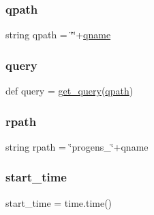 \mbox{\label{namespacequery_a46f3ad2dbb08867f79cc0b7699518b21}} 
\subsubsection{\texorpdfstring{qpath}{qpath}}
{\footnotesize\ttfamily string qpath = \char`\"{}\char`\"{}+\hyperlink{namespacequery_ad85ee362e4d3c01fe2dfe01e693174c5}{qname}}

\mbox{\label{namespacequery_a7077167865224233566753fc78aadb36}} 
\subsubsection{\texorpdfstring{query}{query}}
{\footnotesize\ttfamily def query = \hyperlink{namespacequery_a5c2d384360f955a8d047fe01db312f88}{get\+\_\+query}(\hyperlink{namespacequery_a46f3ad2dbb08867f79cc0b7699518b21}{qpath})}

\mbox{\label{namespacequery_a9391898f449326a0aae5c74a2f8f2da4}} 
\subsubsection{\texorpdfstring{rpath}{rpath}}
{\footnotesize\ttfamily string rpath = \char`\"{}progens\+\_\+\char`\"{}+qname}

\mbox{\label{namespacequery_a2530c3908f0179486a4c2255f792e27a}} 
\subsubsection{\texorpdfstring{start\+\_\+time}{start\_time}}
{\footnotesize\ttfamily start\+\_\+time = time.\+time()}

